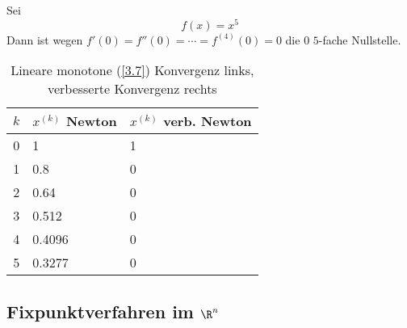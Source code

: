 \documentclass[11pt]{scrartcl}
\begin{document}
\begin{ex*}
	Sei
	\[
		f(x) = x^5
	\]
	Dann ist wegen $f'(0) = f''(0) = \dotsb = f^{(4)}(0) = 0$ die $0$ $5$-fache Nullstelle.
	\begin{table}[h]
		\centering
		\caption{Lineare monotone (\ref{3.7}) Konvergenz links, verbesserte Konvergenz rechts}
		\begin{tabular}{c|l|l}
			$k$ & $x^{(k)}$ Newton & $x^{(k)}$ verb. Newton \\ \hline
			0 & 1 & 1 \\
			1 & 0.8 & 0 \\
			2 & 0.64 & 0 \\
			3 & 0.512 & 0 \\
			4 & 0.4096 & 0 \\
			5 & 0.3277 & 0
		\end{tabular}
	\end{table}
\end{ex*}


\subsection{Fixpunktverfahren im $\R^n$}
\end{document}
